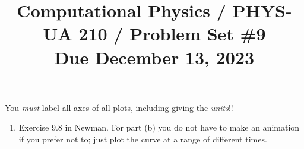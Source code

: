 \documentclass[11pt, preprint]{aastex}
\begin{document}
\title{\bf Computational Physics / PHYS-UA 210 / Problem Set \#9
\\ Due December 13, 2023 }

You {\it must} label all axes of all plots, including giving the {\it
  units}!!

\begin{enumerate} 
\item Exercise 9.8 in Newman. For part (b) you do not have to make an
  animation if you prefer not to; just plot the curve at a range of
  different times.
\end{enumerate} 
\end{document}
